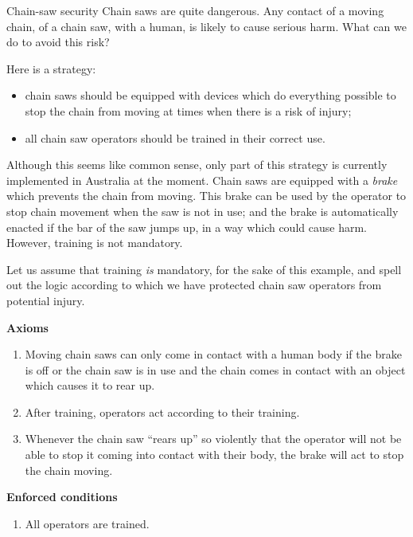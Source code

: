 \begin{example}{Chain-saw security}\label{chainsawsecurityexample}%
Chain saws are quite dangerous. Any contact of a moving chain, of a chain saw, with a human, is likely to cause
serious harm. What can we do to avoid this risk? 

Here is a strategy: 
\begin{itemize}
\item chain saws should be equipped with devices which do everything possible to
stop the chain from moving at times when there is a risk of injury;
\item all chain saw operators should be trained in their correct use.
\end{itemize}

Although this seems like common sense, only part of this strategy is currently implemented
in Australia at the moment. Chain saws are equipped with a {\em brake} which prevents the 
chain from moving. This brake can be used by the operator to stop chain movement when
the saw is not in use; and the brake is automatically enacted if the bar of the saw jumps
up, in a way which could cause harm. However, training is not mandatory. 

Let us assume that training {\em is} mandatory, for the sake of this example, and spell out
the logic according to which we have protected chain saw operators from potential injury.

\newpage
{\bf Axioms}
\begin{enumerate}[{A}1.]
\item\label{A1} Moving chain saws can only come in contact with a human body if the brake is off or
the chain saw is in use and the chain comes in contact with an object which causes it to rear up.

\hspace{-9mm}{\bf Assumptions}

\item\label{A2} After training, operators act according to their training.
\item\label{A3} Whenever the chain saw ``rears up'' so violently that the operator will
not be able to stop it coming into contact with their body, the brake will act to stop
the chain moving.
\end{enumerate}

{\bf Enforced conditions}

\begin{enumerate}[{E}1.]
\item\label{E1} All operators are trained.


\end{enumerate}
\end{example}
